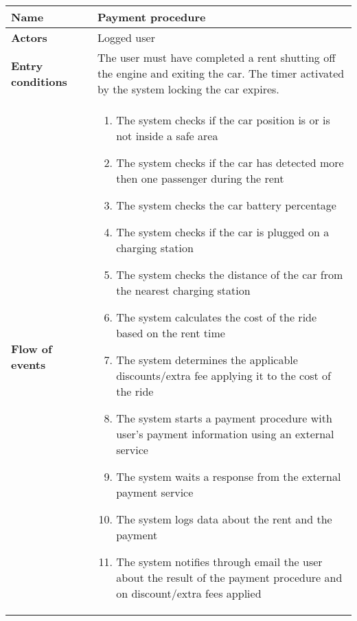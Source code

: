 \begin{tabular}{p{0.25\linewidth}p{0.75\linewidth}}
\toprule
\textbf{Name} & \textbf{Payment procedure} \\
\midrule
\textbf{Actors} &  Logged user\\
\midrule
\textbf{Entry conditions} & 
The user must have completed a rent shutting off the engine and exiting the car. The timer activated by the system locking the car expires. \\
\midrule
\textbf{Flow of events} & 
\begin{enumerate}
	\item The system checks if the car position is or is not inside a safe area
	\item The system checks if the car has detected more then one passenger during the rent
	\item The system checks the car battery percentage
	\item The system checks if the car is plugged on a charging station
	\item The system checks the distance of the car from the nearest charging station
	\item The system calculates the cost of the ride based on the rent time
	\item The system determines the applicable discounts/extra fee applying it to the cost of the ride
	\item The system starts a payment procedure with user's payment information using
	an external service
	\item The system waits a response from the external payment service
	\item The system logs data about the rent and the payment
    \item The system notifies through email the user about the result of the payment procedure and on discount/extra fees applied
\end{enumerate} \\
\midrule
\end{tabular}


